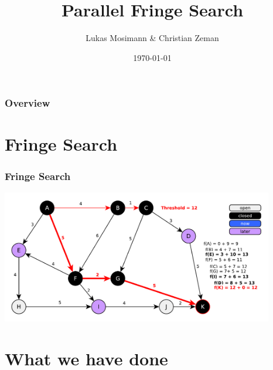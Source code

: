 \documentclass{beamer}
\title[Parallel Fringe Search]{Parallel Fringe Search} %
\author{Lukas Mosimann \& Christian Zeman} %
\institute[ETH] %
{
ETH Zürich \\ %
\medskip
\textit{Design of Parallel and High-Performance Computing} %
}
\date{\today} %
\begin{document}
\begin{frame}
\titlepage %
\end{frame}

\begin{frame}
\frametitle{Overview} %
\tableofcontents %
\end{frame}


\section{Fringe Search} %

\begin{frame}
\frametitle{Fringe Search}
\includegraphics[height=165pt]{fringe7.pdf}
\end{frame}

\section{What we have done}
\end{document}
